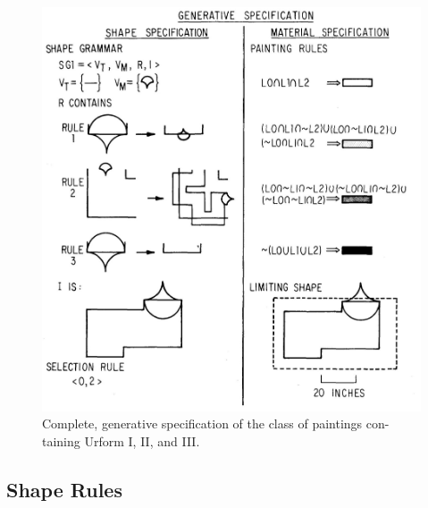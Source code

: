\documentclass[11pt, a4paper]{report}
\begin{document}
\begin{displayquote}
\begin{figure}[!h]
    \centering
        \includegraphics{generativ_specification}
    \caption{ Complete, generative specification of the class of  paintings con-
        taining Urform I, II,  and  III. \citep{shapeGrammars:1972}}
\end{figure}
\end{displayquote}

\subsection{Shape Rules}
\end{document}
